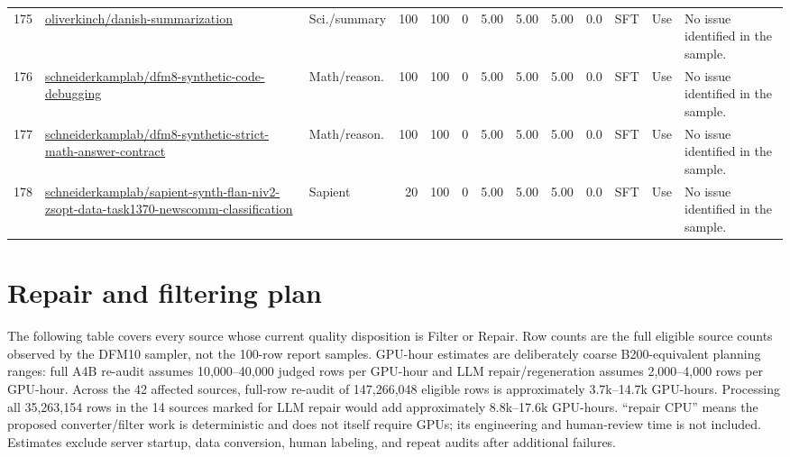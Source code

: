 \documentclass[10pt,a4paper]{article}
\begin{document}
\begin{longtable}{r L{4.0cm} L{1.65cm} r r r r r r r L{1.1cm} L{1.05cm} L{4.9cm}}
175 & \url{oliverkinch/danish-summarization} & Sci./summary & 100 & 100 & 0 & 5.00 & 5.00 & 5.00 & 0.0 & SFT & Use & No issue identified in the sample. \\
176 & \url{schneiderkamplab/dfm8-synthetic-code-debugging} & Math/reason. & 100 & 100 & 0 & 5.00 & 5.00 & 5.00 & 0.0 & SFT & Use & No issue identified in the sample. \\
177 & \url{schneiderkamplab/dfm8-synthetic-strict-math-answer-contract} & Math/reason. & 100 & 100 & 0 & 5.00 & 5.00 & 5.00 & 0.0 & SFT & Use & No issue identified in the sample. \\
178 & \url{schneiderkamplab/sapient-synth-flan-niv2-zsopt-data-task1370-newscomm-classification} & Sapient & 20 & 100 & 0 & 5.00 & 5.00 & 5.00 & 0.0 & SFT & Use & No issue identified in the sample. \\
\end{longtable}

\normalsize
\section*{Repair and filtering plan}
The following table covers every source whose current quality disposition is
Filter or Repair. Row counts are the full eligible source counts observed by the
DFM10 sampler, not the 100-row report samples. GPU-hour estimates are deliberately
coarse B200-equivalent planning ranges: full A4B re-audit assumes
10,000--40,000 judged rows per GPU-hour and LLM repair/regeneration assumes
2,000--4,000 rows per GPU-hour. Across the 42 affected sources,
full-row re-audit of 147,266,048 eligible rows is approximately
3.7k--14.7k GPU-hours. Processing
all 35,263,154 rows in the 14 sources marked for LLM
repair would add approximately
8.8k--17.6k GPU-hours. ``repair
CPU'' means the proposed converter/filter work is deterministic and does not
itself require GPUs; its engineering and human-review time is not included.
Estimates exclude server startup, data conversion, human labeling, and repeat
audits after additional failures.
\end{document}
